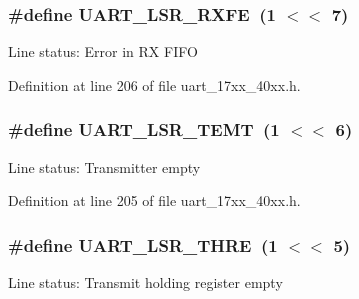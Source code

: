 \subsubsection[{\texorpdfstring{U\+A\+R\+T\+\_\+\+L\+S\+R\+\_\+\+R\+X\+FE}{UART_LSR_RXFE}}]{\setlength{\rightskip}{0pt plus 5cm}\#define U\+A\+R\+T\+\_\+\+L\+S\+R\+\_\+\+R\+X\+FE~(1 $<$$<$ 7)}\hypertarget{group__UART__17XX__40XX_ga5972ac77db6249142b482356427dcf7c}{}\label{group__UART__17XX__40XX_ga5972ac77db6249142b482356427dcf7c}
Line status\+: Error in RX F\+I\+FO 

Definition at line 206 of file uart\+\_\+17xx\+\_\+40xx.\+h.

\subsubsection[{\texorpdfstring{U\+A\+R\+T\+\_\+\+L\+S\+R\+\_\+\+T\+E\+MT}{UART_LSR_TEMT}}]{\setlength{\rightskip}{0pt plus 5cm}\#define U\+A\+R\+T\+\_\+\+L\+S\+R\+\_\+\+T\+E\+MT~(1 $<$$<$ 6)}\hypertarget{group__UART__17XX__40XX_gadb3f8bb82f0a253700fdb88d8c609710}{}\label{group__UART__17XX__40XX_gadb3f8bb82f0a253700fdb88d8c609710}
Line status\+: Transmitter empty 

Definition at line 205 of file uart\+\_\+17xx\+\_\+40xx.\+h.

\subsubsection[{\texorpdfstring{U\+A\+R\+T\+\_\+\+L\+S\+R\+\_\+\+T\+H\+RE}{UART_LSR_THRE}}]{\setlength{\rightskip}{0pt plus 5cm}\#define U\+A\+R\+T\+\_\+\+L\+S\+R\+\_\+\+T\+H\+RE~(1 $<$$<$ 5)}\hypertarget{group__UART__17XX__40XX_gae05118527ef8873b9d7b1b0be0153019}{}\label{group__UART__17XX__40XX_gae05118527ef8873b9d7b1b0be0153019}
Line status\+: Transmit holding register empty 

